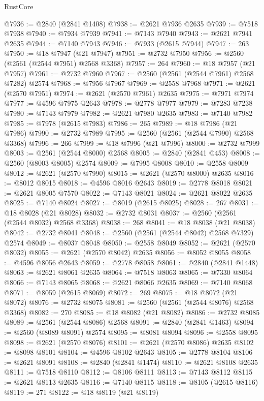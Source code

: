 \begin{lexlean}{RustCore}
\begin{coremodule}
@7936 := @2840 (@2841 @1408)
@7938 := @2621 @7936 @2635
@7939 := @7518 @7938
@7940 := @7934 @7939
@7941 := @7143 @7940
@7943 := @2621 @7941 @2635
@7944 := @7140 @7943
@7946 := @7933 (@2615 @7944)
@7947 := 263
@7950 := @18 @7947 (@21 @7947)
@7951 := @2732 @7950
@7956 := @2560 (@2561 (@2544 @7951) @2568 @3368)
@7957 := 264
@7960 := @18 @7957 (@21 @7957)
@7961 := @2732 @7960
@7967 := @2560 (@2561 (@2544 @7961) @2568 @7282) @2574
@7968 := @7956 @7967
@7969 := @2558 @7968
@7971 := @2621 (@2570 @7951)
@7974 := @2621 (@2570 @7961) @2635
@7975 := @7971 @7974
@7977 := @4596 @7975 @2643
@7978 := @2778 @7977
@7979 := @7283 @7238
@7980 := @7143 @7979
@7982 := @2621 @7980 @2635
@7983 := @7140 @7982
@7985 := @7978 (@2615 @7983)
@7986 := 265
@7989 := @18 @7986 (@21 @7986)
@7990 := @2732 @7989
@7995 := @2560 (@2561 (@2544 @7990) @2568 @3368)
@7996 := 266
@7999 := @18 @7996 (@21 @7996)
@8000 := @2732 @7999
@8003 := @2561 (@2544 @8000) @2568
@8005 := @2840 (@2841 @453)
@8008 := @2560 (@8003 @8005) @2574
@8009 := @7995 @8008
@8010 := @2558 @8009
@8012 := @2621 (@2570 @7990)
@8015 := @2621 (@2570 @8000) @2635
@8016 := @8012 @8015
@8018 := @4596 @8016 @2643
@8019 := @2778 @8018
@8021 := @2621 @8005 @7570
@8022 := @7143 @8021
@8024 := @2621 @8022 @2635
@8025 := @7140 @8024
@8027 := @8019 (@2615 @8025)
@8028 := 267
@8031 := @18 @8028 (@21 @8028)
@8032 := @2732 @8031
@8037 := @2560 (@2561 (@2544 @8032) @2568 @3368)
@8038 := 268
@8041 := @18 @8038 (@21 @8038)
@8042 := @2732 @8041
@8048 := @2560 (@2561 (@2544 @8042) @2568 @7329) @2574
@8049 := @8037 @8048
@8050 := @2558 @8049
@8052 := @2621 (@2570 @8032)
@8055 := @2621 (@2570 @8042) @2635
@8056 := @8052 @8055
@8058 := @4596 @8056 @2643
@8059 := @2778 @8058
@8061 := @2840 (@2841 @1448)
@8063 := @2621 @8061 @2635
@8064 := @7518 @8063
@8065 := @7330 @8064
@8066 := @7143 @8065
@8068 := @2621 @8066 @2635
@8069 := @7140 @8068
@8071 := @8059 (@2615 @8069)
@8072 := 269
@8075 := @18 @8072 (@21 @8072)
@8076 := @2732 @8075
@8081 := @2560 (@2561 (@2544 @8076) @2568 @3368)
@8082 := 270
@8085 := @18 @8082 (@21 @8082)
@8086 := @2732 @8085
@8089 := @2561 (@2544 @8086) @2568
@8091 := @2840 (@2841 @1463)
@8094 := @2560 (@8089 @8091) @2574
@8095 := @8081 @8094
@8096 := @2558 @8095
@8098 := @2621 (@2570 @8076)
@8101 := @2621 (@2570 @8086) @2635
@8102 := @8098 @8101
@8104 := @4596 @8102 @2643
@8105 := @2778 @8104
@8106 := @2621 @8091
@8108 := @2840 (@2841 @1474)
@8110 := @2621 @8108 @2635
@8111 := @7518 @8110
@8112 := @8106 @8111
@8113 := @7143 @8112
@8115 := @2621 @8113 @2635
@8116 := @7140 @8115
@8118 := @8105 (@2615 @8116)
@8119 := 271
@8122 := @18 @8119 (@21 @8119)

\end{coremodule}
\end{lexlean}
